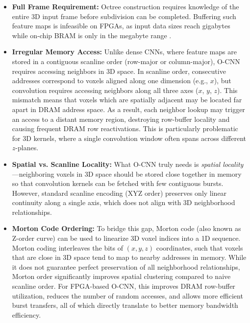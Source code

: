 \documentclass[sigconf, screen]{acmart}
\begin{document}
\begin{itemize}
    \item \textbf{Full Frame Requirement:} Octree construction requires knowledge of the entire 3D input frame before subdivision can be completed. Buffering such feature maps is infeasible on FPGAs, as input data sizes reach gigabytes while on-chip BRAM is only in the megabyte range \cite{amddatasheet}.
    
    \item \textbf{Irregular Memory Access:} 
    Unlike dense CNNs, where feature maps are stored in a contiguous scanline order (row-major or column-major), O-CNN requires accessing neighbors in 3D space. In scanline order, consecutive addresses correspond to voxels aligned along one dimension (e.g., $x$), but convolution requires accessing neighbors along all three axes ($x$, $y$, $z$). This mismatch means that voxels which are spatially adjacent may be located far apart in DRAM address space. As a result, each neighbor lookup may trigger an access to a distant memory region, destroying row-buffer locality and causing frequent DRAM row reactivations. This is particularly problematic for 3D kernels, where a single convolution window often spans across different $z$-planes.
    
    \item \textbf{Spatial vs. Scanline Locality:}
    What O-CNN truly needs is \emph{spatial locality}---neighboring voxels in 3D space should be stored close together in memory so that convolution kernels can be fetched with few contiguous bursts. However, standard scanline encoding (XYZ order) preserves only linear continuity along a single axis, which does not align with 3D neighborhood relationships. 
    
    \item \textbf{Morton Code Ordering:}
    To bridge this gap, Morton code (also known as Z-order curve) can be used to linearize 3D voxel indices into a 1D sequence. Morton coding interleaves the bits of $(x, y, z)$ coordinates, such that voxels that are close in 3D space tend to map to nearby addresses in memory. While it does not guarantee perfect preservation of all neighborhood relationships, Morton order significantly improves spatial clustering compared to naive scanline order. For FPGA-based O-CNN, this improves DRAM row-buffer utilization, reduces the number of random accesses, and allows more efficient burst transfers, all of which directly translate to better memory bandwidth efficiency. 
\end{itemize}
\end{document}
